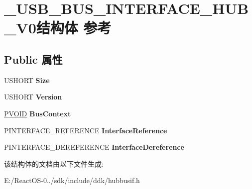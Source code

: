 \hypertarget{struct___u_s_b___b_u_s___i_n_t_e_r_f_a_c_e___h_u_b___v0}{}\section{\+\_\+\+U\+S\+B\+\_\+\+B\+U\+S\+\_\+\+I\+N\+T\+E\+R\+F\+A\+C\+E\+\_\+\+H\+U\+B\+\_\+\+V0结构体 参考}
\label{struct___u_s_b___b_u_s___i_n_t_e_r_f_a_c_e___h_u_b___v0}
\subsection*{Public 属性}
\begin{DoxyCompactItemize}
\item 
\mbox{\label{struct___u_s_b___b_u_s___i_n_t_e_r_f_a_c_e___h_u_b___v0_a9c8511ec1c59192b2325a900404d8fa1}} 
U\+S\+H\+O\+RT {\bfseries Size}
\item 
\mbox{\label{struct___u_s_b___b_u_s___i_n_t_e_r_f_a_c_e___h_u_b___v0_a174861a8689aa4843dcd76aabcdd97fd}} 
U\+S\+H\+O\+RT {\bfseries Version}
\item 
\mbox{\label{struct___u_s_b___b_u_s___i_n_t_e_r_f_a_c_e___h_u_b___v0_af07e2d10b780448a334e8d064f049f26}} 
\hyperlink{interfacevoid}{P\+V\+O\+ID} {\bfseries Bus\+Context}
\item 
\mbox{\label{struct___u_s_b___b_u_s___i_n_t_e_r_f_a_c_e___h_u_b___v0_a58b2d4684784d1a474e7e3a524509255}} 
P\+I\+N\+T\+E\+R\+F\+A\+C\+E\+\_\+\+R\+E\+F\+E\+R\+E\+N\+CE {\bfseries Interface\+Reference}
\item 
\mbox{\label{struct___u_s_b___b_u_s___i_n_t_e_r_f_a_c_e___h_u_b___v0_a96804fd9251294c8360ef67bb5d36064}} 
P\+I\+N\+T\+E\+R\+F\+A\+C\+E\+\_\+\+D\+E\+R\+E\+F\+E\+R\+E\+N\+CE {\bfseries Interface\+Dereference}
\end{DoxyCompactItemize}


该结构体的文档由以下文件生成\+:\begin{DoxyCompactItemize}
\item 
E\+:/\+React\+O\+S-\/0../sdk/include/ddk/hubbusif.\+h\end{DoxyCompactItemize}
